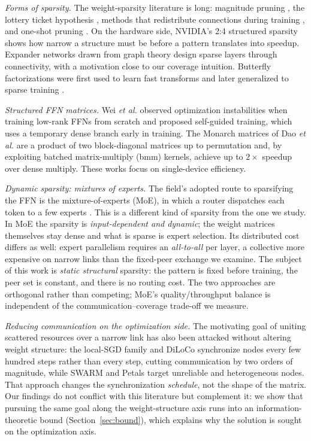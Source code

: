 \documentclass[10pt,journal]{IEEEtran}
\begin{document}
\emph{Forms of sparsity.} The weight-sparsity literature is long: magnitude pruning
\cite{han2015}, the lottery ticket hypothesis \cite{frankle2019}, methods that redistribute
connections during training \cite{rigl2020}, and one-shot pruning \cite{sparsegpt2023}. On the
hardware side, NVIDIA's 2:4 structured sparsity \cite{nm2021} shows how narrow a structure must
be before a pattern translates into speedup. Expander networks drawn from graph theory
\cite{expander2018} design sparse layers through connectivity, with a motivation close to our
coverage intuition. Butterfly factorizations were first used to learn fast transforms
\cite{dao2019} and later generalized to sparse training \cite{pixelbutterfly2022}.

\emph{Structured FFN matrices.} Wei \emph{et al.} \cite{wei2024} observed optimization
instabilities when training low-rank FFNs from scratch and proposed self-guided training, which
uses a temporary dense branch early in training. The Monarch matrices of Dao \emph{et al.}
\cite{dao2022} are a product of two block-diagonal matrices up to permutation and, by exploiting
batched matrix-multiply (bmm) kernels, achieve up to $2\times$ speedup over dense multiply.
These works focus on single-device efficiency.

\emph{Dynamic sparsity: mixtures of experts.} The field's adopted route to sparsifying the FFN
is the mixture-of-experts (MoE), in which a router dispatches each token to a few experts
\cite{shazeer2017,gshard2021,switch2022}. This is a different kind of sparsity from the one we study. In MoE the
sparsity is \emph{input-dependent and dynamic}; the weight matrices themselves stay dense and
what is sparse is expert selection. Its distributed cost differs as well: expert parallelism
requires an \emph{all-to-all} per layer, a collective more expensive on narrow links than the
fixed-peer exchange we examine. The subject of this work is \emph{static structural} sparsity:
the pattern is fixed before training, the peer set is constant, and there is no routing cost.
The two approaches are orthogonal rather than competing; MoE's quality/throughput balance is
independent of the communication--coverage trade-off we measure.

\emph{Reducing communication on the optimization side.} The motivating goal of uniting
scattered resources over a narrow link has also been attacked without altering weight
structure: the local-SGD family \cite{stich2019} and DiLoCo \cite{diloco2023} synchronize nodes
every few hundred steps rather than every step, cutting communication by two orders of
magnitude, while SWARM \cite{swarm2023} and Petals \cite{petals2023} target unreliable and
heterogeneous nodes. That
approach changes the synchronization \emph{schedule}, not the shape of the matrix. Our findings
do not conflict with this literature but complement it: we show that pursuing the same goal
along the weight-structure axis runs into an information-theoretic bound
(Section~\ref{sec:bound}), which explains why the solution is sought on the optimization axis.
\end{document}
